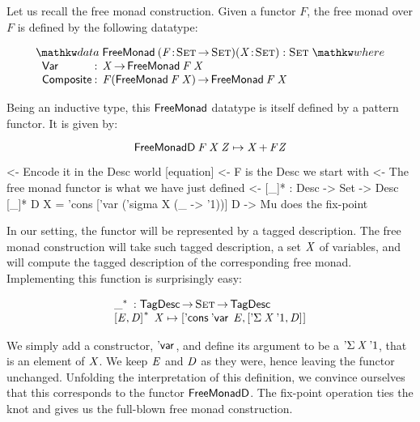 \newcommand{\FMFreeMonad}{\D{FreeMonad}}
\newcommand{\FMFreeMonadD}{\D{FreeMonadD}}
\newcommand{\FMVar}{\C{Var}}
\newcommand{\FMComposite}{\C{Composite}}

Let us recall the free monad construction. Given a functor $F$, the
free monad over $F$ is defined by the following datatype:

\[
\stk{
\data \FMFreeMonad\: \PITEL{\V{F}}{\Set \To \Set} 
                     \PITEL{\V{X}}{\Set} :
                     \Set 
\where \\
\;\;\begin{array}{@{}l@{\::\:\:}l@{\quad}l}
    \FMVar           & \V{X} \To \FMFreeMonad\: \V{F}\: \V{X}                            \\
    \FMComposite     & \V{F} (\FMFreeMonad\: \V{F}\: \V{X}) \To \FMFreeMonad\: \V{F}\: \V{X}    
\end{array}
}
\]


Being an inductive type, this $\FMFreeMonad$ datatype is itself
defined by a pattern functor. It is given by:

\[
\FMFreeMonadD\: \V{F}\: \V{X}\: \V{Z} \mapsto \V{X} \mathop{\D{+}} \V{F} \V{Z}
\]

\begin{wstructure}
    <- Encode it in the Desc world [equation]
        <- F is the Desc we start with
        <- The free monad functor is what we have just defined
        <- [\_]* : Desc -> Set -> Desc
           [\_]* D X = 'cons ['var ('sigma X (\_ -> '1))] D
        -> Mu does the fix-point
\end{wstructure}

In our setting, the functor will be represented by a tagged
description. The free monad construction will take such tagged
description, a set $\V{X}$ of variables, and will compute the tagged
description of the corresponding free monad. Implementing this
function is surprisingly easy:

\[\stk{
\FreeMonad{\_} : \TagDesc \To \Set \To \TagDesc \\
\FreeMonad{\pair{\V{E}}{\V{D}}{}}\:\V{X} \mapsto
    \pair{\ListCons{\DVar{}}{\V{E}}}
         {\pair{\DSigma{\V{X}}{\DUnit}}{\V{D}}{}}{}
}\]

We simply add a constructor, $\DVar{\!}$, and define its argument to
be a $\DSigma{\V{X}}{\DUnit}$, that is an element of $\V{X}$. We keep
$\V{E}$ and $\V{D}$ as they were, hence leaving the functor
unchanged. Unfolding the interpretation of this definition, we
convince ourselves that this corresponds to the functor
$\FMFreeMonadD$. The fix-point operation ties the knot and gives us
the full-blown free monad construction.

